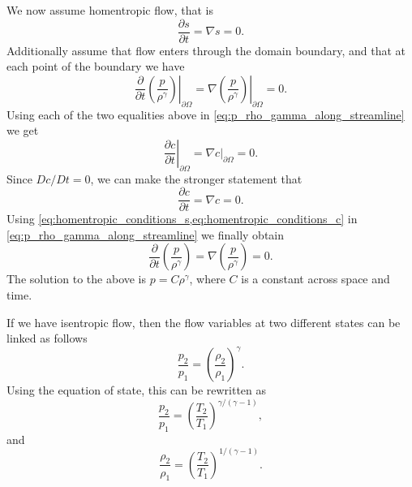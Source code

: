 \documentclass[oneside,a4paper,11pt]{report}
\begin{document}
We now assume homentropic flow, that is 
\begin{equation}
    \label{eq:homentropic_conditions_s}
    \frac{\partial s}{\partial t} = \nabla s = 0.
\end{equation}
Additionally assume that flow enters through the domain boundary, and that at each point of the boundary we have
\begin{equation}
    \left . \frac{\partial}{\partial t} \left ( \frac{p}{\rho^\gamma} \right ) \right |_{\partial \Omega} = \left . \nabla \left ( \frac{p}{\rho^\gamma} \right ) \right |_{\partial \Omega} = 0.
\end{equation}
Using each of the two equalities above in \cref{eq:p_rho_gamma_along_streamline} we get
\begin{equation}
    \left . \frac{\partial c}{\partial t} \right |_{\partial \Omega} = \left . \nabla c \right |_{\partial \Omega} = 0.
\end{equation}
Since $Dc/Dt=0$, we can make the stronger statement that
\begin{equation}
    \label{eq:homentropic_conditions_c}
    \frac{\partial c}{\partial t} = \nabla c = 0.
\end{equation}
Using \cref{eq:homentropic_conditions_s,eq:homentropic_conditions_c} in \cref{eq:p_rho_gamma_along_streamline} we finally obtain
\begin{equation}
    \label{eq:p_rho_gamma_homentropic}
    \frac{\partial}{\partial t} \left ( \frac{p}{\rho^\gamma} \right ) = \nabla \left ( \frac{p}{\rho^\gamma} \right ) = 0.
\end{equation}
The solution to the above is $p = C \rho^\gamma$, where $C$ is a constant across space and time.

If we have isentropic flow, then the flow variables at two different states can be linked as follows
\begin{equation}
\label{eq:isentropic_relation_perfect_gas_1}
    \frac{p_2}{p_1} = \left(\frac{\rho_2}{\rho_1} \right)^\gamma.
\end{equation}
Using the equation of state, this can be rewritten as
\begin{equation}
\label{eq:isentropic_relation_perfect_gas_2}
    \frac{p_2}{p_1} = \left ( \frac{T_2}{T_1} \right)^{\gamma/(\gamma-1)},
\end{equation}
and
\begin{equation}
\label{eq:isentropic_relation_perfect_gas_3}
    \frac{\rho_2}{\rho_1} = \left ( \frac{T_2}{T_1} \right)^{1/(\gamma-1)}.
\end{equation}
\end{document}
